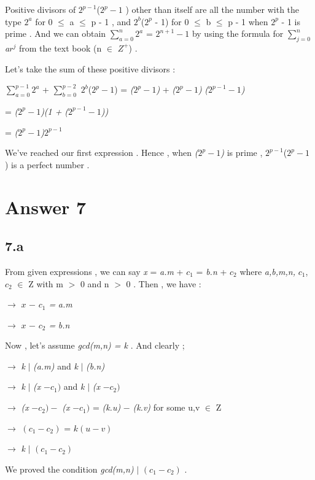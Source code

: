 \documentclass[12pt]{article}
\begin{document}
\hspace{15px} Positive divisors of \textit{$2^{p-1}$}(\textit{$2^{p} - 1$} ) other than itself are all the number with the type \textit{$2^{a}$} for 0 $\leq$ a $\leq$ p - 1 , and \textit{$2^{b}$}(\textit{$2^{p}$} - 1) for 0 $\leq$ b $\leq$ p - 1 when \textit{$2^{p}$} - 1 is prime . And we can obtain  $\sum_{a=0}^{n}$\textit{$2^{a}$} = \textit{$2^{n+1} - 1$} by using the formula for $\sum_{j=0}^{n}$ \textit{a}\textit{$r^{j}$} from the text book (n $\in$ \textit{$Z^{+}$}) . \par 
Let's take the sum of these positive divisors : \par \bigskip
$\sum_{a=0}^{p - 1}$\textit{$2^{a}$} + $\sum_{b=0}^{p - 2}$ \textit{$2^{b}$}(\textit{$2^{p} - 1$}) = \textit{($2^{p} - 1$)} + \textit{($2^{p} - 1$)} \textit{($2^{p - 1} - 1$)}  \par 
\hspace{136px}  = \textit{($2^{p} - 1$)}\textit{(1 +} \textit{($2^{p - 1} - 1$))} \par 
\hspace{136px} = \textit{($2^{p} - 1$)}\textit{$2^{p - 1}$} \par 
We've reached our first expression . Hence , when \textit{($2^{p} - 1$)} is prime , \textit{$2^{p-1}$}(\textit{$2^{p} - 1$} ) is a perfect number .




\section*{Answer 7}

\subsection*{7.a}

\hspace{15px} From given expressions ,  we can say \textit{x} = \textit{a.m} + \textit{$c_1$} = \textit{b.n} + \textit{$c_2$} where \textit{a,b,m,n,} \textit{$c_1$},\textit{$c_2$} $\in$ Z with m $>$ 0 and n $>$ 0 . Then , we have : \par \bigskip

$\rightarrow$ \textit{$x$} \textit{$-$} \textit{$c_1$ =} \textit{a.m} \par
$\rightarrow$ \textit{$x$} \textit{$-$} \textit{$c_2$ =} \textit{b.n} \par
Now , let's assume \textit{gcd(m,n) = k} . 
And clearly ;  \par 
$\rightarrow$ \textit{k} $\vert$ \textit{(a.m)} and \textit{k} $\vert$ \textit{(b.n)} \par 
$\rightarrow$ \textit{k} $\vert$ \textit{(x} \textit{$- c_1)$} and \textit{k} $\vert$ \textit{(x} \textit{$- c_2)$}\par 
$\rightarrow$ \textit{(x} \textit{$- c_2) - $} \textit{(x} \textit{$- c_1)$} = \textit{(k.u)} \textit{$-$} \textit{(k.v)} for some u,v $\in$ Z \par 
$\rightarrow$ \textit{$(c_1 - c_2)$} = \textit{$k (u - v)$} \par 
$\rightarrow$ \textit{k} $\vert$ \textit{$(c_1 - c_2)$} \par 
We proved the condition \textit{gcd(m,n)} $\vert$ \textit{$(c_1 - c_2)$} .
\end{document}
